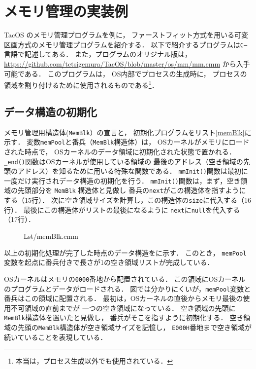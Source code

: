 \chapter{メモリ管理の実装例}
TacOS のメモリ管理プログラムを例に，
ファーストフィット方式を用いる可変区画方式のメモリ管理プログラムを紹介する．
以下で紹介するプログラムは{\tt C--}言語で記述してある．
また，プログラムのオリジナル版は，
\url{https://github.com/tctsigemura/TacOS/blob/master/os/mm/mm.cmm}
から入手可能である．
このプログラムは，
OS内部でプロセスの生成時に，
プロセスの領域を割り付けるために使用されるものである\footnote{
本当は，プロセス生成以外でも使用されている．}．

\section{データ構造の初期化}
メモリ管理用構造体({\tt MemBlk}）の宣言と，
初期化プログラムをリスト\ref{memBlk}に示す．
変数{\tt memPool}と番兵（{\tt MemBlk}構造体）は，
OSカーネルがメモリにロードされた時点で，
OSカーネルのデータ領域に初期化された状態で置かれる．
{\tt \_end()}関数はOSカーネルが使用している領域の
最後のアドレス（空き領域の先頭のアドレス）を知るために用いる特殊な関数である．
{\tt mmInit()}関数は最初に一度だけ実行されデータ構造の初期化を行う．
{\tt mmInit()}関数は，まず，空き領域の先頭部分を {\tt MemBlk} 構造体と見做し
番兵の{\tt next}がこの構造体を指すようにする（15行）．
次に空き領域サイズを計算し，この構造体の{\tt size}に代入する（16行）．
最後にこの構造体がリストの最後になるように
{\tt next}に{\tt null}を代入する（17行）．

\begin{figure}[btph]

{Lst/memBlk.cmm}
\end{figure}

以上の初期化処理が完了した時点のデータ構造をに示す．
このとき，
{\tt memPool}変数を起点に番兵付きで長さが1の空き領域リストが完成している．

OSカーネルはメモリの{\tt 0000}番地から配置されている．
この領域にOSカーネルのプログラムとデータがロードされる．
図では分かりにくいが，{\tt memPool}変数と番兵はこの領域に配置される．
最初は，OSカーネルの直後からメモリ最後の使用不可領域の直前までが
一つの空き領域になっている．
空き領域の先頭に{\tt MemBlk}構造体を置いたと見做し，
番兵がそこを指すように初期化する．
空き領域の先頭の{\tt MemBlk}構造体が空き領域サイズを記憶し，
{\tt E000H}番地まで空き領域が続いていることを表現している．

